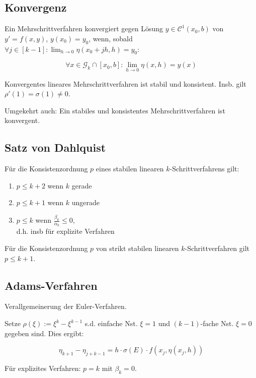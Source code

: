 \subsection*{Konvergenz}

Ein Mehrschrittverfahren konvergiert gegen Lösung $y \in \mathcal{C}^1(x_0,b)$ von $y'=f(x,y)$, $y(x_0)=y_0$, wenn, sobald $\forall j \in [k-1] : \lim_{h \to 0} \eta(x_0+jh,h)=y_0$:

\[ \forall x \in \mathcal{G}_k \cap [x_0,b] : \lim_{h \to 0} \eta(x,h) = y(x) \]

Konvergentes lineares Mehrschrittverfahren ist stabil und konsistent. Insb. gilt $\rho'(1)=\sigma(1) \neq 0$.

\spacing

Umgekehrt auch: Ein stabiles und konsistentes Mehrschrittverfahren ist konvergent.

\subsection*{Satz von Dahlquist}

Für die Konsistenzordnung $p$ eines stabilen linearen $k$-Schrittverfahrens gilt:

\begin{enumerate}
\item $p \leq k + 2$ wenn $k$ gerade
\item $p \leq k + 1$ wenn $k$ ungerade
\item $p \leq k$ wenn $\frac{\beta_k}{\alpha_k} \leq 0$,\\ d.h. insb für explizite Verfahren
\end{enumerate}

Für die Konsistenzordnung $p$ von strikt stabilen linearen $k$-Schrittverfahren gilt $p \leq k + 1$.

\subsection*{Adams-Verfahren}

Verallgemeinerung der Euler-Verfahren.

Setze $\rho(\xi) := \xi^k - \xi^{k-1}$ s.d. einfache Nst. $\xi=1$ und $(k-1)$-fache Nst. $\xi = 0$ gegeben sind. Dies ergibt:

\vspace*{-2mm}
\[ \eta_{k+1}-\eta_{j+k-1} = h \cdot \sigma(E) \cdot f(x_j,\eta(x_j,h)) \]

Für explizites Verfahren: $p = k$ mit $\beta_k = 0$.

